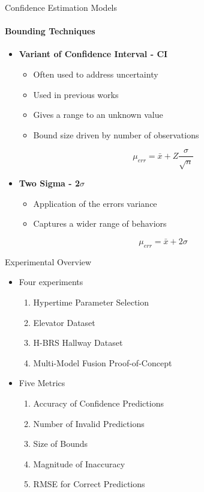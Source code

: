\documentclass{beamer}
\begin{document}
\begin{frame}[t]{Confidence Estimation Models}
  \framesubtitle{Bounding Techniques}
  \begin{itemize}

  \item \textbf{Variant of Confidence Interval - CI}
      \begin{itemize}
        \item Often used to address uncertainty
        \item Used in previous works \cite{Shrestha2006}
        \item Gives a range to an unknown value
        \item Bound size driven by number of observations
      \end{itemize}

    \begin{equation}
      \mu_{err} = \bar{x} + Z \frac{\sigma}{\sqrt{n}}
    \end{equation}

    \item \textbf{Two Sigma - 2$\sigma$}
      \begin{itemize}
        \item Application of the errors variance
        \item Captures a wider range of behaviors
      \end{itemize}

    \begin{equation}
      \mu_{err} = \bar{x} + 2\sigma
    \end{equation}


  \end{itemize}
\end{frame}


\begin{frame}[t]{Experimental Overview}
  \begin{itemize}
  \setlength\itemsep{1.5em}
    \item Four experiments
    \begin{enumerate}
      \item Hypertime Parameter Selection
      \item Elevator Dataset
      \item H-BRS Hallway Dataset
      \item Multi-Model Fusion Proof-of-Concept
    \end{enumerate}

    \item Five Metrics
    \begin{enumerate}
      \item Accuracy of Confidence Predictions
      \item Number of Invalid Predictions
      \item Size of Bounds
      \item Magnitude of Inaccuracy
      \item RMSE for Correct Predictions
    \end{enumerate}
  \end{itemize}
\end{frame}
\end{document}
